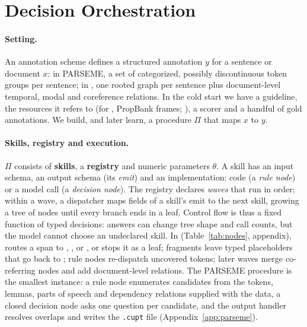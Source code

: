 \section{Decision Orchestration}
\label{sec:method}

\paragraph{Setting.}
An annotation scheme defines a structured annotation $y$ for a sentence or document $x$: in PARSEME, a set of categorized, possibly discontinuous token groups per sentence; in \umr, one rooted graph per sentence plus document-level temporal, modal and coreference relations. In the cold start we have a guideline, the resources it refers to (for \umr, PropBank frames; \citealp{palmer2005propbank}), a scorer and a handful of gold annotations. We build, and later learn, a procedure $\Pi$ that maps $x$ to $y$.

\paragraph{Skills, registry and execution.}
$\Pi$ consists of \textbf{skills}, a \textbf{registry} and numeric parameters $\theta$. A skill has an input schema, an output schema (its \emph{emit}) and an implementation: code (a \emph{rule node}) or a model call (a \emph{decision node}). The registry declares \emph{waves} that run in order; within a wave, a dispatcher maps fields of a skill's emit to the next skill, growing a tree of nodes until every branch ends in a leaf. Control flow is thus a fixed function of typed decisions: answers can change tree shape and call counts, but the model cannot choose an undeclared skill.
In \umr (Table~\ref{tab:nodes}, appendix),  routes a span to , ,  or , or stops it as a leaf; fragments leave typed placeholders that go back to ; rule nodes re-dispatch uncovered tokens; later waves merge co-referring nodes and add document-level relations. The PARSEME procedure is the smallest instance: a rule node enumerates candidates from the tokens, lemmas, parts of speech and dependency relations supplied with the data, a closed decision node asks one question per candidate, and the output handler resolves overlaps and writes the \texttt{.cupt} file (Appendix~\ref{app:parseme}).

